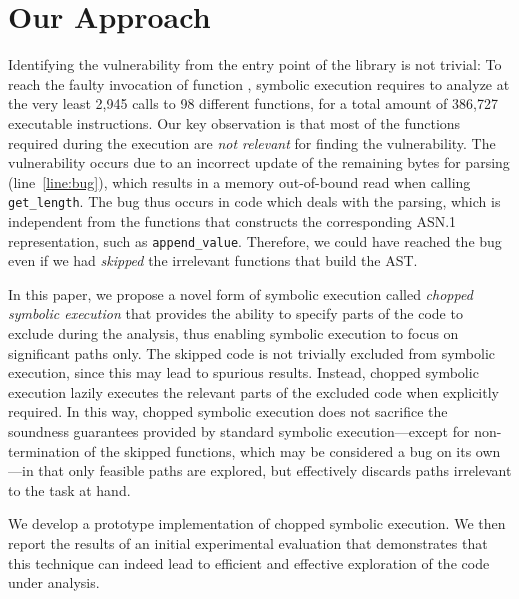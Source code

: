 \section{Our Approach}
Identifying the vulnerability from the entry point of the library is
not trivial: To reach the faulty invocation of function ,
symbolic execution requires to analyze at the very least 2,945 calls
to 98 different functions, for a total amount of 386,727 executable
instructions. Our key observation is that most of the functions
required during the execution are \textit{not relevant} for finding
the vulnerability. The vulnerability occurs due to an incorrect update
of the remaining bytes for parsing (line~\ref{line:bug}), which
results in a memory out-of-bound read when calling
\texttt{get\_length}. The bug thus occurs in code which deals with the
parsing, which is independent from the functions that constructs the
corresponding ASN.1 representation, such as \texttt{append\_value}.
Therefore, we could have reached the bug even if we had \emph{skipped}
the irrelevant functions that build the AST.

In this paper, we propose a novel form of symbolic execution called
\emph{chopped symbolic execution} that provides the ability to specify
parts of the code to exclude during the analysis, thus enabling
symbolic execution to focus on significant paths only. The skipped
code is not trivially excluded from symbolic execution, since this may
lead to spurious results. Instead, chopped symbolic execution lazily
executes the relevant parts of the excluded code when explicitly
required. In this way, chopped symbolic execution does not sacrifice
the soundness guarantees provided by standard symbolic
execution---except for non-termination of the skipped functions, which
may be considered a bug on its own---in that only feasible paths are
explored, but effectively discards paths irrelevant to the task at
hand.

We develop a prototype implementation of chopped symbolic
execution. We then report the results of an initial experimental
evaluation that demonstrates that this technique can indeed lead to
efficient and effective exploration of the code under analysis.

